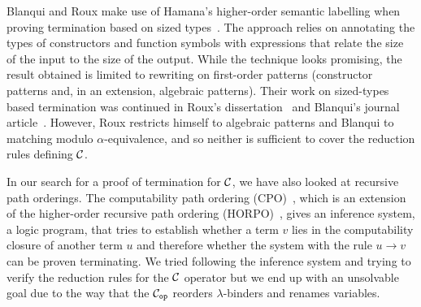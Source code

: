 
Blanqui and Roux make use of Hamana's higher-order semantic labelling when
proving termination based on sized types~\cite{blanqui2009relation}. The
approach relies on annotating the types of constructors and function
symbols with expressions that relate the size of the input to the size of
the output. While the technique looks promising, the result obtained is
limited to rewriting on first-order patterns (constructor patterns and, in
an extension, algebraic patterns). Their work on sized-types based
termination was continued in Roux's dissertation~\cite{roux2011size} and
Blanqui's journal article~\cite{blanqui2015size}. However, Roux restricts
himself to algebraic patterns and Blanqui to matching modulo
$\alpha$-equivalence, and so neither is sufficient to cover the reduction
rules defining $\mathcal{C}$.

In our search for a proof of termination for $\mathcal{C}$, we have also looked at
recursive path orderings. The computability path ordering
(CPO)~\cite{blanqui2015computability}, which is an extension of the
higher-order recursive path ordering (HORPO)~\cite{jouannaud1999higher},
gives an inference system, a logic program, that tries to establish whether
a term $v$ lies in the computability closure of another term $u$ and
therefore whether the system with the rule $u \to v$ can be proven
terminating. We tried following the inference system and trying to verify
the reduction rules for the $\mathcal{C}$ operator but we end up with an unsolvable
goal due to the way that the $\mathcal{C}_{\mathtt{op}}$ reorders $\lambda$-binders and
renames variables.
